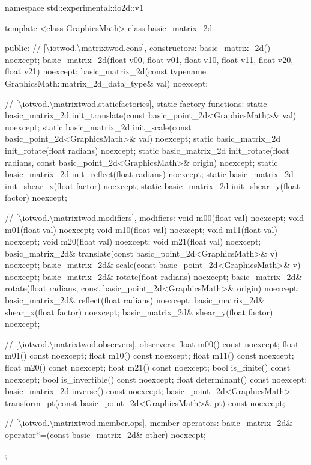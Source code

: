 \begin{codeblock}
namespace std::experimental::io2d::v1 {
  template <class GraphicsMath>
  class basic_matrix_2d {
  public:
    // \ref{\iotwod.\matrixtwod.cons}, constructors:
    basic_matrix_2d() noexcept;
    basic_matrix_2d(float v00, float v01, float v10, float v11, float v20, float v21) noexcept;
    basic_matrix_2d(const typename GraphicsMath::matrix_2d_data_type& val) noexcept;

    // \ref{\iotwod.\matrixtwod.staticfactories}, static factory functions:
    static basic_matrix_2d init_translate(const basic_point_2d<GraphicsMath>& val) noexcept;
    static basic_matrix_2d init_scale(const basic_point_2d<GraphicsMath>& val) noexcept;
    static basic_matrix_2d init_rotate(float radians) noexcept;
    static basic_matrix_2d init_rotate(float radians,
      const basic_point_2d<GraphicsMath>& origin) noexcept;
    static basic_matrix_2d init_reflect(float radians) noexcept;
    static basic_matrix_2d init_shear_x(float factor) noexcept;
    static basic_matrix_2d init_shear_y(float factor) noexcept;

    // \ref{\iotwod.\matrixtwod.modifiers}, modifiers:
    void m00(float val) noexcept;
    void m01(float val) noexcept;
    void m10(float val) noexcept;
    void m11(float val) noexcept;
    void m20(float val) noexcept;
    void m21(float val) noexcept;
    basic_matrix_2d& translate(const basic_point_2d<GraphicsMath>& v) noexcept;
    basic_matrix_2d& scale(const basic_point_2d<GraphicsMath>& v) noexcept;
    basic_matrix_2d& rotate(float radians) noexcept;
    basic_matrix_2d& rotate(float radians, const basic_point_2d<GraphicsMath>& origin) noexcept;
    basic_matrix_2d& reflect(float radians) noexcept;
    basic_matrix_2d& shear_x(float factor) noexcept;
    basic_matrix_2d& shear_y(float factor) noexcept;

    // \ref{\iotwod.\matrixtwod.observers}, observers:
    float m00() const noexcept;
    float m01() const noexcept;
    float m10() const noexcept;
    float m11() const noexcept;
    float m20() const noexcept;
    float m21() const noexcept;
    bool is_finite() const noexcept;
    bool is_invertible() const noexcept;
    float determinant() const noexcept;
    basic_matrix_2d inverse() const noexcept;
    basic_point_2d<GraphicsMath> transform_pt(const basic_point_2d<GraphicsMath>& pt)
      const noexcept;

    // \ref{\iotwod.\matrixtwod.member.ops}, member operators:
    basic_matrix_2d& operator*=(const basic_matrix_2d& other) noexcept;
  };

}
\end{codeblock}
